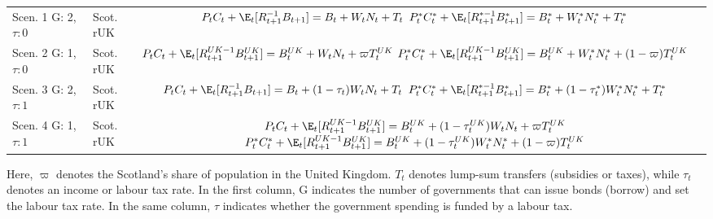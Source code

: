 \begin{table}[H]
    \centering
    \renewcommand{\arraystretch}{2}
    \begin{tabular}{l|l|c}
    \makecell{Scen. 1 \\ G: 2, $\tau: 0$} & \makecell{Scot. \\ rUK } & 
        \makecell{
            $P_t C_t + \E_t [{R^{-1}_{t+1}}B_{t+1}] = B_t + W_t N_t + T_t$ \\
            $P^*_t C^*_t + \E_t [{R^{*-1}_{t+1}}B^*_{t+1}] = B^*_t + W^*_t N^*_t + T^*_t$
        }  \\ 
    \makecell{Scen. 2 \\ G: 1, $\tau: 0$} & \makecell{Scot. \\ rUK } & 
        \makecell{
            $P_t C_t + \E_t [{R^{UK-1}_{t+1}}B^{UK}_{t+1}] = B^{UK}_t + W_t N_t + \varpi T^{UK}_t$ \\
            $P^*_t C^*_t + \E_t [{R^{UK-1}_{t+1}}B^{UK}_{t+1}] = B^{UK}_t + W^*_t N^*_t + (1-\varpi)T^{UK}_t$
        }   \\ 
    \makecell{Scen. 3 \\ G: 2, $\tau: 1$} & \makecell{Scot. \\ rUK } & 
    \makecell{
        $P_t C_t + \E_t [{R^{-1}_{t+1}}B_{t+1}] = B_t + (1-\tau_t)W_t N_t + T_t$ \\
        $P^*_t C^*_t + \E_t [{R^{*-1}_{t+1}}B^*_{t+1}] = B^*_t + (1-\tau^*_t)W^*_t N^*_t + T^*_t$ 
    }  \\
    \makecell{Scen. 4 \\ G: 1, $\tau: 1$} & \makecell{Scot. \\ rUK } & 
    \makecell{
        $P_t C_t + \E_t [{R^{UK-1}_{t+1}}B^{UK}_{t+1}] = B^{UK}_t + (1-\tau^{UK}_t)W_t N_t + \varpi T^{UK}_t$ \\
        $P^*_t C^*_t + \E_t [{R^{UK-1}_{t+1}}B^{UK}_{t+1}] = B^{UK}_t + (1-\tau^{UK}_t)W^*_t N^*_t + (1-\varpi)T^{UK}_t$
    }  
    \end{tabular}
\end{table}
Here, $\varpi$ denotes the Scotland's share of population in the United Kingdom. $T_t$ denotes lump-sum transfers (subsidies or taxes), while $\tau_t$ denotes an income or labour tax rate. In the first column, G indicates the number of governments that can issue bonds (borrow) and set the labour tax rate. In the same column, $\tau$ indicates whether the government spending is funded by a labour tax.

